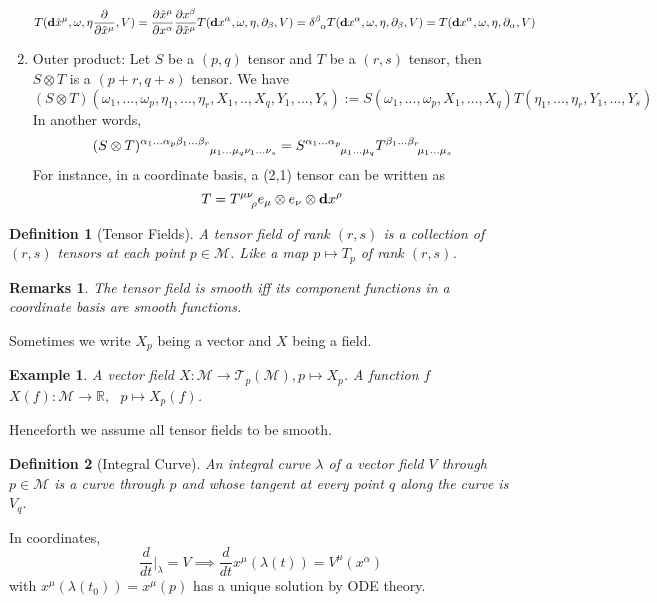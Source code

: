\documentclass[a4paper]{article}
\newtheorem{eg}{Example}[section]
\newtheorem{remarks}{Remarks}[section]
\theoremstyle{new}
\newtheorem{defi}{Definition}[section]
\begin{document}
\begin{enumerate}
    $$T(\mathbf{d}\tilde{x}^\mu,\omega,\eta\frac{\partial}{\partial\tilde{x}^\mu},V)=\frac{\partial\tilde{x}^\mu}{\partial x^\alpha}\frac{\partial x^\beta}{\partial\tilde{x}^\mu}T(\mathbf{d}x^\alpha,\omega,\eta,\partial_\beta,V)=\tensor*{\delta}{*_{}^{\beta}_{\alpha}}T(\mathbf{d}x^\alpha,\omega,\eta,\partial_\beta,V)=T(\mathbf{d}x^\alpha,\omega,\eta,\partial_\alpha,V)$$
    \item Outer product: Let $S$ be a $(p,q)$ tensor and $T$ be a $(r,s)$ tensor, then $S\otimes T$ is a $(p+r,q+s)$ tensor. We have
    $$(S\otimes T)(\omega_1,...,\omega_p,\eta_1,...,\eta_r,X_1,..,X_q,Y_1,...,Y_s):=S(\omega_1,...,\omega_p,X_1,...,X_q)T(\eta_1,...,\eta_r,Y_1,...,Y_s)$$
    In another words,
    $$\tensor*{(S\otimes T)}{*_{}^{\alpha_1...\alpha_p\beta_1...\beta_r}_{\mu_1...\mu_q\nu_1...\nu_s}}=\tensor*{S}{*_{}^{\alpha_1...\alpha_p}_{\mu_1...\mu_q}}\tensor*{T}{*_{}^{\beta_1...\beta_r}_{\mu_1...\mu_s}}$$
    For instance, in  a coordinate basis, a (2,1) tensor can be written as
        $$T=\tensor*{T}{*_{}^{\mu\nu}_{\rho}}e_\mu\otimes e_\nu\otimes\mathbf{d}x^\rho$$
\end{enumerate}
\begin{defi}[Tensor Fields]
A tensor field of rank $(r,s)$ is a collection of $(r,s)$ tensors at each point $p\in\mathcal{M}$. Like a map $p\mapsto T_p$ of rank $(r,s)$.
\end{defi}
\begin{remarks}
The tensor field is smooth iff its component functions in a coordinate basis are smooth functions.
\end{remarks}
Sometimes we write $X_p$ being a vector and $X$ being a field.
\begin{eg}
A vector field $X:\mathcal{M}\rightarrow\mathcal{T}_p(\mathcal{M}),p\mapsto X_p$. A function $f$ $X(f):\mathcal{M}\rightarrow\mathbb{R},\text{  }p\mapsto X_p(f)$.
\end{eg}
Henceforth we assume all tensor fields to be smooth.
\begin{defi}[Integral Curve]
An integral curve $\lambda$ of a vector field $V$ through $p\in\mathcal{M}$ is a curve through $p$ and whose tangent at every point $q$ along the curve is $V_q$. 
\end{defi}
In coordinates, 
$$\frac{d}{dt}\bigg|_\lambda=V\implies\frac{d}{dt}x^\mu(\lambda(t))=V^\mu(x^\alpha)$$
with $x^\mu(\lambda(t_0))=x^\mu(p)$ has a unique solution by ODE theory.
\end{document}
